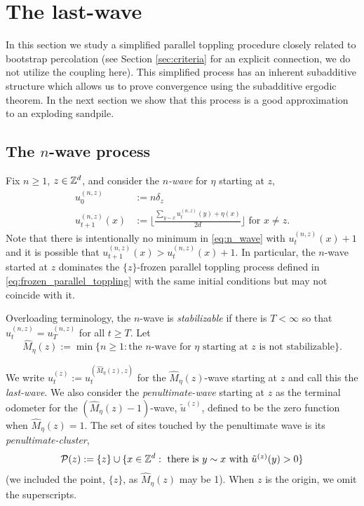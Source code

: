 \documentclass[12pt]{amsart}
\begin{document}
\section{The last-wave}\label{sec:last_wave}
In this section we study a simplified parallel toppling procedure closely related to bootstrap percolation (see Section \ref{sec:criteria}
for an explicit connection, we do not utilize the coupling here). This simplified process has an inherent subadditive structure
which allows us to prove convergence using the subadditive ergodic theorem. In the next section we show that this process is a good approximation to an exploding sandpile. 


\subsection{\texorpdfstring{The $n$-wave process}{The n-wave process}} \label{subsec:n_wave}
Fix $n \geq 1$, $z \in \mathbb{Z}^d$, and consider the {\it $n$-wave} for $\eta$ starting at $z$,
\begin{equation} \label{eq:n_wave}
\begin{aligned}
u_0^{(n,z)} &:= n  \delta_z \\
u_{t+1}^{(n,z)}(x) &:= \lfloor \frac{ \sum_{y \sim x}  u_{t}^{(n,z)}(y) + \eta(x)}{2 d} \rfloor \mbox{ for $x \not= z$}.
\end{aligned}
\end{equation}
Note that there is intentionally no minimum in \eqref{eq:n_wave} with $u^{(n,z)}_t(x) + 1$
and it is possible that $u_{t+1}^{(n,z)}(x) > u_t^{(n,z)}(x) + 1$.
In particular, the $n$-wave started at $z$ dominates the $\{z\}$-frozen parallel toppling process defined in \eqref{eq:frozen_parallel_toppling} with the same initial conditions but may not coincide with it.

Overloading terminology, 
the $n$-wave is {\it stabilizable} if there is $T < \infty$
so that $u^{(n,z)}_{t} = u^{(n,z)}_{T}$ for all $t \geq T$. Let 
\begin{equation}
\hat{M}_{\eta}(z) := \min \{ n \geq 1 : \mbox{the $n$-wave for $\eta$ starting at $z$ is not stabilizable}\}.
\end{equation}


We write $u_t^{(z)} := u_t^{(\hat{M}_{\eta}(z),z)}$ for the $\hat{M}_{\eta}(z)$-wave starting at $z$ and call this the {\it last-wave}.  We also consider
the {\it penultimate-wave} starting at $z$ as the terminal odometer for the $(\hat{M}_{\eta}(z) - 1)$-wave, 
$\tilde{u}^{(z)}$, defined to be the zero function when $\hat{M}_{\eta}(z) = 1$. The set of sites touched by the penultimate wave is its {\it penultimate-cluster},
\begin{equation} \label{eq:penultimate_cluster}
\mathcal{P}(z) := \{z\} \cup \{ x \in \mathbb{Z}^d : \mbox{ there is $y \sim x$ with $\tilde{u}^{(z)}(y) > 0 $}\}
\end{equation}
(we included the point, $\{z\}$, as $\hat{M}_{\eta}(z)$ may be 1). When $z$ is the origin, we omit the superscripts. 
\end{document}
